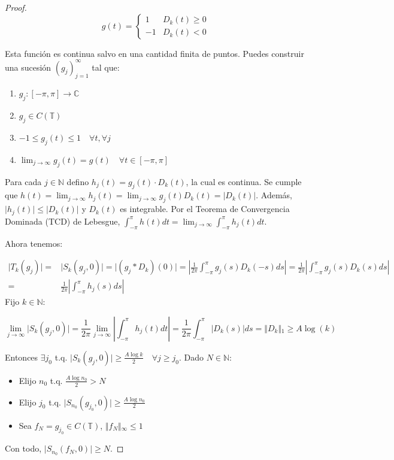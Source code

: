 \begin{proof}
$$g(t) = \begin{cases} 1 & D_k(t) \ge 0 \\ -1 & D_k(t) < 0 \end{cases} $$


Esta función es continua salvo en una cantidad finita de puntos. Puedes construir una sucesión $(g_j)_{j=1}^\infty$ tal que:
\begin{enumerate}
\item[(a)] $g_j: [-\pi, \pi] \rightarrow \mathbb{C}$
\item[(b)] $g_j \in C(\mathbb{T})$
\item[(c)] $-1 \le g_j(t) \le 1 \quad \forall t, \forall j$
\item[(d)] $\lim_{j\to\infty} g_j(t) = g(t) \quad \forall t \in [-\pi, \pi]$
\end{enumerate}

Para cada $j \in \mathbb{N}$ defino $h_j(t) = g_j(t) \cdot D_k(t)$, la cual es continua.
Se cumple que $h(t) = \lim_{j\to\infty} h_j(t) = \lim_{j\to\infty} g_j(t) D_k(t) = \vert{}D_k(t)\vert{}$.
Además, $\vert{}h_j(t)\vert{} \le \vert{}D_k(t)\vert{}$ y $D_k(t)$ es integrable.
Por el Teorema de Convergencia Dominada (TCD) de Lebesgue, $\int_{-\pi}^\pi h(t) dt = \lim_{j\to\infty} \int_{-\pi}^\pi h_j(t) dt$.

Ahora tenemos:

\begin{align*}
\vert{}T_k(g_j)\vert{} = & \vert{}S_k(g_j, 0)\vert{} = \vert{}(g_j * D_k)(0)\vert{} = \left\vert{} \frac{1}{2\pi} \int_{-\pi}^\pi g_j(s) D_k(-s) ds \right\vert{}  =  \frac{1}{2\pi} \left\vert{} \int_{-\pi}^\pi g_j(s) D_k(s) ds \right\vert{} \\ = & \frac{1}{2\pi} \left\vert{} \int_{-\pi}^\pi h_j(s) ds \right\vert{}
\end{align*}
Fijo $k \in \mathbb{N}$:


$$\lim_{j\to\infty} \vert{}S_k(g_j, 0)\vert{} = \frac{1}{2\pi} \lim_{j\to\infty} \left\vert{} \int_{-\pi}^\pi h_j(t) dt \right\vert{} = \frac{1}{2\pi} \int_{-\pi}^\pi \vert{}D_k(s)\vert{} ds = \Vert{}D_k\Vert{}_1 \ge A \log(k)$$

Entonces $\exists j_0$ t.q. $\vert{}S_k(g_j, 0)\vert{} \ge \frac{A \log k}{2} \quad \forall j \ge j_0$.
Dado $N \in \mathbb{N}$:
\begin{itemize}
\item Elijo $n_0$ t.q. $\frac{A \log n_0}{2} > N$
\item Elijo $j_0$ t.q. $\vert{}S_{n_0}(g_{j_0}, 0)\vert{} \ge \frac{A \log n_0}{2}$
\item Sea $f_N = g_{j_0} \in C(\mathbb{T})$, $\Vert{}f_N\Vert{}_\infty \le 1$
\end{itemize}
Con todo, $\vert{}S_{n_0}(f_N, 0)\vert{} \ge N$.

\end{proof}


